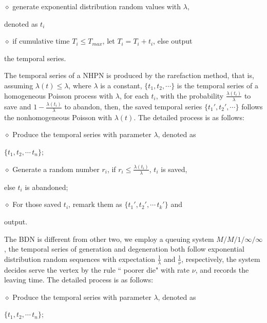\documentclass[final]{IEEEtran}
\begin{document}
\noindent$\diamond$ generate exponential distribution random
values with $\lambda$,

 denoted as $t_{i}$

\noindent$\diamond$ if cumulative time $T_{i}\leq T_{max}$, let
$T_{i}=T_{i}+t_{i}$, else output

the temporal series.


The temporal series of a NHPN is produced by the rarefaction
method, that is, assuming $\lambda (t)\leq \lambda$, where
$\lambda$ is a constant, $\{t_{1}, t_{2}, \cdots\}$ is the
temporal series of a homogeneous Poisson process with $\lambda$,
for each $t_{i}$, with the probability $\frac{\lambda
(t_{i})}{\lambda}$ to save and $1-\frac{\lambda (t_{i})}{\lambda}$
to abandon, then, the saved temporal series $\{t_{1}', t_{2}',
\cdots\}$ follows the nonhomogeneous Poisson with $\lambda (t)$.
The detailed process is as follows:

\noindent$\diamond$ Produce the temporal series with parameter
$\lambda$, denoted as

$\{t_{1}, t_{2}, \cdots\, t_{n}\}$;

\noindent$\diamond$ Generate a random number $r_{i}$, if
$r_{i}\leq \frac{\lambda (t_{i})}{\lambda}$, $t_{i}$ is saved,

else $t_{i}$ is abandoned;

\noindent$\diamond$ For those saved $t_{i}$, remark them as
$\{t_{1}', t_{2}', \cdots\, t_{k}'\}$ and

output.




The BDN is different from other two, we employ a queuing system
$M/M/1/\infty/\infty$, the temporal series of generation and
degeneration both follow exponential distribution random sequences
with expectation $\frac{1}{\lambda}$ and $\frac{1}{\nu}$,
respectively, the system decides serve the vertex by the rule ``
poorer die" with rate $\nu$, and records the leaving time. The
detailed process is as follows:

\noindent$\diamond$ Produce the temporal series with parameter
$\lambda$, denoted as

 $\{t_{1}, t_{2}, \cdots\, t_{n}\}$;
\end{document}
